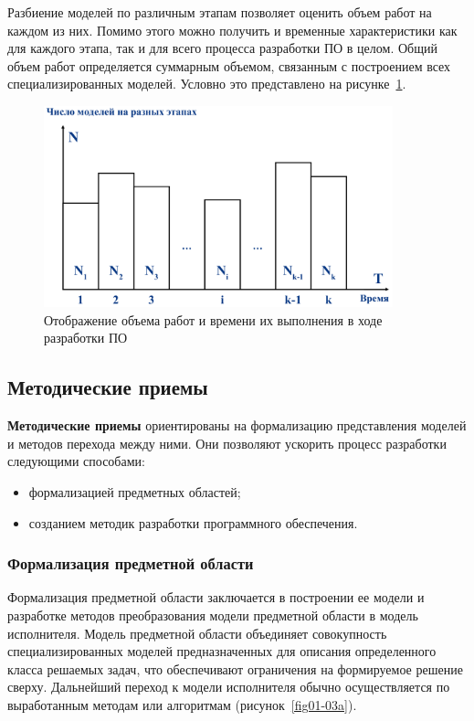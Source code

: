 Разбиение моделей по различным этапам позволяет оценить объем работ на каждом из них. Помимо этого можно получить и временные характеристики как для каждого этапа, так и для всего процесса разработки ПО в целом. Общий объем работ определяется суммарным объемом, связанным с построением всех специализированных моделей. Условно это представлено на рисунке~\ref{fdiag01}.

\begin{figure}[htbp]
    \centering
    \includegraphics[width=0.9\textwidth]{img/fdiag01.png}
    \caption{Отображение объема работ и времени их выполнения в ходе разработки ПО}
    \label{fdiag01}
\end{figure}

\subsection{Методические приемы}

\textbf{Методические приемы} ориентированы на формализацию представления моделей и методов перехода между ними. Они позволяют ускорить процесс разработки следующими способами:

\begin{itemize}
    \item формализацией предметных областей;
    \item созданием методик разработки программного обеспечения.
\end{itemize}

\subsubsection*{Формализация предметной области}

Формализация предметной области заключается в построении ее модели и разработке методов преобразования модели предметной области в модель исполнителя. Модель предметной области объединяет совокупность специализированных моделей предназначенных для описания определенного класса решаемых задач, что обеспечивают ограничения на формируемое решение сверху. Дальнейший переход к модели исполнителя обычно осуществляется по выработанным методам или алгоритмам (рисунок~\ref{fig01-03a}).

